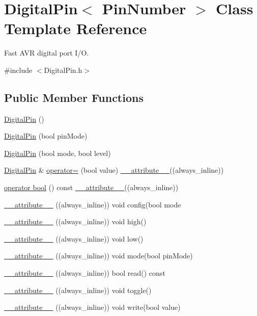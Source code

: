 \hypertarget{class_digital_pin}{\section{Digital\-Pin$<$ Pin\-Number $>$ Class Template Reference}
\label{class_digital_pin}
}


Fast A\-V\-R digital port I/\-O.  




{\ttfamily \#include $<$Digital\-Pin.\-h$>$}

\subsection*{Public Member Functions}
\begin{DoxyCompactItemize}
\item 
\hyperlink{class_digital_pin_a1d78389acd564b7c9381330fdd23eb03}{Digital\-Pin} ()
\item 
\hyperlink{class_digital_pin_ae1517ba2394860237680fc3a3ba34073}{Digital\-Pin} (bool pin\-Mode)
\item 
\hyperlink{class_digital_pin_ae959501b29aba5bb264127fc9d7f5cef}{Digital\-Pin} (bool mode, bool level)
\item 
\hyperlink{class_digital_pin}{Digital\-Pin} \& \hyperlink{class_digital_pin_a7b60c216751ba225517cd158ed312ec5}{operator=} (bool value) \hyperlink{class_digital_pin_a0ee76ba764259da3324009b59929ed3d}{\-\_\-\-\_\-attribute\-\_\-\-\_\-}((always\-\_\-inline))
\item 
\hyperlink{class_digital_pin_aa06d24301da2b81f8d2f98deefd2ab07}{operator bool} () const \hyperlink{class_digital_pin_a0ee76ba764259da3324009b59929ed3d}{\-\_\-\-\_\-attribute\-\_\-\-\_\-}((always\-\_\-inline))
\item 
\hyperlink{class_digital_pin_a0ee76ba764259da3324009b59929ed3d}{\-\_\-\-\_\-attribute\-\_\-\-\_\-} ((always\-\_\-inline)) void config(bool mode
\item 
\hyperlink{class_digital_pin_a1d3608d12c5d7d1ced5cf89b8a2efead}{\-\_\-\-\_\-attribute\-\_\-\-\_\-} ((always\-\_\-inline)) void high()
\item 
\hyperlink{class_digital_pin_a7c8dfa2cd238b4c8172df8c8e0b75fa6}{\-\_\-\-\_\-attribute\-\_\-\-\_\-} ((always\-\_\-inline)) void low()
\item 
\hyperlink{class_digital_pin_aee2526484b1601c8dd69534a1a393f60}{\-\_\-\-\_\-attribute\-\_\-\-\_\-} ((always\-\_\-inline)) void mode(bool pin\-Mode)
\item 
\hyperlink{class_digital_pin_af31b7333e751d84df793d823254032d8}{\-\_\-\-\_\-attribute\-\_\-\-\_\-} ((always\-\_\-inline)) bool read() const 
\item 
\hyperlink{class_digital_pin_a57f6cf9cbd61abb7dc9bfcdc1b16edc7}{\-\_\-\-\_\-attribute\-\_\-\-\_\-} ((always\-\_\-inline)) void toggle()
\item 
\hyperlink{class_digital_pin_a1b176c901f3bd935aad21f46fe6e5a61}{\-\_\-\-\_\-attribute\-\_\-\-\_\-} ((always\-\_\-inline)) void write(bool value)
\end{DoxyCompactItemize}
